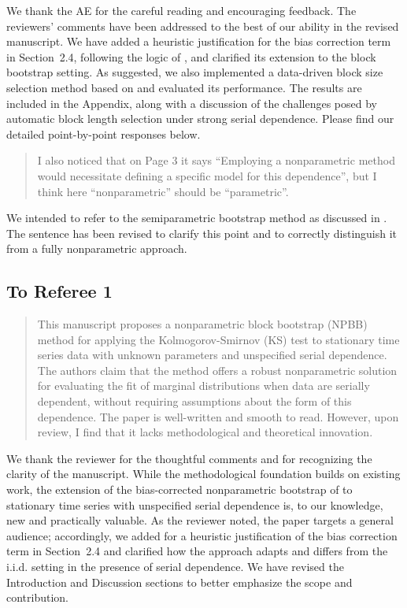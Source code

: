 \documentclass[12pt]{article}
\newenvironment{comment}%
{\begin{quotation}\noindent\small\it\color{darkblue}\ignorespaces%
}{\end{quotation}}
\begin{document}
We thank the AE for the careful reading and encouraging feedback. The
reviewers’ comments have been addressed to the best of our ability in
the revised manuscript. We have added a heuristic justification for
the bias correction term in Section~2.4, following the logic of
\citet{babu2004goodness}, and clarified its extension to the block
bootstrap setting. As suggested, we also implemented a data-driven
block size selection method based on \citet{politis2004automatic} and
evaluated its performance. The results are included in the Appendix,
along with a discussion of the challenges posed by automatic block
length selection under strong serial dependence. Please find our
detailed point-by-point responses below.

\begin{comment}
I also noticed that on Page 3 it says “Employing a nonparametric method would necessitate defining a specific model for this dependence”, but I think here “nonparametric” should be “parametric”.
\end{comment}

We intended to refer to the semiparametric bootstrap method as
discussed in \citep{zeimbekakis2024misuses}. The sentence has been
revised to clarify this point and to correctly distinguish it from a
fully nonparametric approach.


\subsection*{To Referee 1}

\begin{comment}
This manuscript proposes a nonparametric block bootstrap (NPBB) method for applying the
Kolmogorov-Smirnov (KS) test to stationary time series data with unknown parameters and unspecified serial dependence. The authors claim that the method offers a robust nonparametric solution for evaluating the fit of marginal distributions when data are serially dependent, without
requiring assumptions about the form of this dependence. The paper is well-written and smooth
to read. However, upon review, I find that it lacks methodological and theoretical innovation.
\end{comment}


We thank the reviewer for the thoughtful comments and for recognizing
the clarity of the manuscript. While the methodological foundation
builds on existing work, the extension of the bias-corrected
nonparametric bootstrap of \citet{babu2004goodness} to stationary time
series with unspecified serial dependence is, to our knowledge, new
and practically valuable. As the reviewer noted, the paper targets a
general audience; accordingly, we added for a heuristic justification
of the bias correction term in Section~2.4 and clarified how the
approach adapts and differs from the i.i.d. setting in the presence of
serial dependence. We have revised the Introduction and Discussion
sections to better emphasize the scope and contribution.
\end{document}
